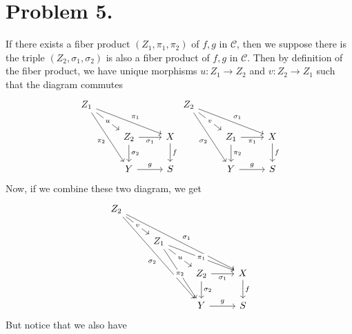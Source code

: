 \documentclass[12pt]{amsart}
\begin{document}
\section*{Problem 5.}
\noindent If there exists a fiber product $(Z_1,\pi_1,\pi_2)$ of $f,g$ in $\mathcal{C}$, then we suppose there is the triple $(Z_2,\sigma_1,\sigma_2)$ is also a fiber product of $f,g$ in $\mathcal{C}$. Then by definition of the fiber product, we have unique morphisms $u:Z_1\to Z_2$ and $v: Z_2\to Z_1$ such that the diagram commutes
\[    \begin{tikzcd}
        Z_1 \arrow[rd, "u" description] \arrow[rrd, "\pi_1"] \arrow[rdd, "\pi_2"'] &                                                     &     \\
        & Z_2 \arrow[r, "\sigma_1"'] \arrow[d, "\sigma_2"] & X \arrow[d, "f"]\\
        & Y \arrow[r,"g"]                                                 & S
    \end{tikzcd}
    \begin{tikzcd}
        Z_2 \arrow[rd, "v" description] \arrow[rrd, "\sigma_1"] \arrow[rdd, "\sigma_2"'] &                                                     &     \\
        & Z_1 \arrow[r, "\pi_1"'] \arrow[d, "\pi_2"] & X \arrow[d, "f"]\\
        & Y \arrow[r,"g"]                                                 & S
    \end{tikzcd}
\]
Now, if we combine these two diagram, we get
\[
    \begin{tikzcd}
        Z_2 \arrow[rd, "v" description] \arrow[rrrdd, "\sigma_1"] \arrow[rrddd, "\sigma_2"'] &                                                                                                   &                                                  &                  \\
        & Z_1 \arrow[rd, "u" description] \arrow[rrd, "\pi_1" description] \arrow[rdd, "\pi_2" description] &                                                  &                  \\
        &                                                                                                   & Z_2 \arrow[r, "\sigma_1"'] \arrow[d, "\sigma_2"] & X \arrow[d, "f"] \\
        &                                                                                                   & Y \arrow[r, "g"]                                 & S
    \end{tikzcd}\]
But notice that we also have
\end{document}
